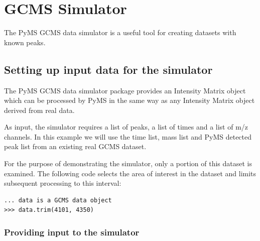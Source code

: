 

\chapter{GCMS Simulator}

The PyMS GCMS data simulator is a useful tool for creating datasets with known
peaks. 



\section{Setting up input data for the simulator}

The PyMS GCMS data simulator package provides an Intensity Matrix object 
which can be processed by PyMS in 
the same way as any Intensity Matrix object derived from real data.

As input, the simulator requires a list of peaks, a list of times and a list of
m/z channels. In this example we will use the time list, mass list and PyMS detected
peak list from an existing real GCMS dataset.

For the purpose of demonstrating the simulator, only a portion of this dataset is 
examined. The following code selects the area of interest in the dataset and
limits subsequent processing to this interval:

\begin{verbatim}
... data is a GCMS data object
>>> data.trim(4101, 4350)
\end{verbatim}

\subsection{Providing input to the simulator}

